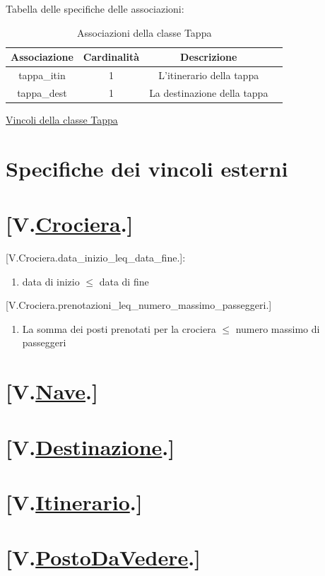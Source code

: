 \documentclass{article}
\begin{document}
Tabella delle specifiche delle associazioni:
\begin{table}[h!]
    \centering
    \begin{tabular}{|c|c|c|c|}
        \hline
        Associazione & Cardinalità & Descrizione \\
        \hline
        tappa\_itin & 1 & L'itinerario della tappa \\
        tappa\_dest & 1 & La destinazione della tappa \\
        \hline
    \end{tabular}
    \caption{Associazioni della classe Tappa}
\end{table}

\hyperref[sec:VincoliTappa]{Vincoli della classe Tappa}

\newpage
\section{Specifiche dei vincoli esterni}

\section*{[V.\hyperref[sec:Crociera]{Crociera}.]}\label{sec:VincoliCrociera}
    [V.Crociera.data\_inizio\_leq\_data\_fine.]:
    \begin{enumerate}
        \item data di inizio $\leq$ data di fine
    \end{enumerate}
    [V.Crociera.prenotazioni\_leq\_numero\_massimo\_passeggeri.]
    \begin{enumerate}
        \item La somma dei posti prenotati per la crociera $\leq$ numero massimo di passeggeri
    \end{enumerate}
\section*{[V.\hyperref[sec:Nave]{Nave}.]}\label{sec:VincoliNave}
\section*{[V.\hyperref[sec:Destinazione]{Destinazione}.]}\label{sec:VincoliDestinazione}
\section*{[V.\hyperref[sec:Itinerario]{Itinerario}.]}\label{sec:VincoliItinerario}
\section*{[V.\hyperref[sec:PostoDaVedere]{PostoDaVedere}.]}\label{sec:VincoliPostoDaVedere}
\end{document}
